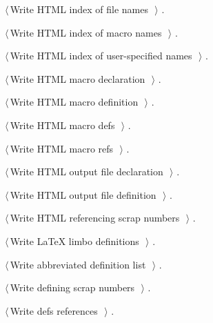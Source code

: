 \documentclass{report}
\begin{document}
{\begin{list}{}{\setlength{\itemsep}{-\parsep}\setlength{\itemindent}{-\leftmargin}}
\item $\langle\,$Write HTML index of file names\nobreak\ {\footnotesize {}}$\,\rangle$ {\footnotesize {\NWtxtRefIn} .}
\item $\langle\,$Write HTML index of macro names\nobreak\ {\footnotesize {}}$\,\rangle$ {\footnotesize {\NWtxtRefIn} .}
\item $\langle\,$Write HTML index of user-specified names\nobreak\ {\footnotesize {}}$\,\rangle$ {\footnotesize {\NWtxtRefIn} .}
\item $\langle\,$Write HTML macro declaration\nobreak\ {\footnotesize {}}$\,\rangle$ {\footnotesize {\NWtxtRefIn} .}
\item $\langle\,$Write HTML macro definition\nobreak\ {\footnotesize {}}$\,\rangle$ {\footnotesize {\NWtxtRefIn} .}
\item $\langle\,$Write HTML macro defs\nobreak\ {\footnotesize {}}$\,\rangle$ {\footnotesize {\NWtxtRefIn} .}
\item $\langle\,$Write HTML macro refs\nobreak\ {\footnotesize {}}$\,\rangle$ {\footnotesize {\NWtxtRefIn} .}
\item $\langle\,$Write HTML output file declaration\nobreak\ {\footnotesize {}}$\,\rangle$ {\footnotesize {\NWtxtRefIn} .}
\item $\langle\,$Write HTML output file definition\nobreak\ {\footnotesize {}}$\,\rangle$ {\footnotesize {\NWtxtRefIn} .}
\item $\langle\,$Write HTML referencing scrap numbers\nobreak\ {\footnotesize {}}$\,\rangle$ {\footnotesize {\NWtxtRefIn} .}
\item $\langle\,$Write LaTeX limbo definitions\nobreak\ {\footnotesize {}}$\,\rangle$ {\footnotesize {\NWtxtRefIn} .
}
\item $\langle\,$Write abbreviated definition list\nobreak\ {\footnotesize {}}$\,\rangle$ {\footnotesize {\NWtxtRefIn} .}
\item $\langle\,$Write defining scrap numbers\nobreak\ {\footnotesize {}}$\,\rangle$ {\footnotesize {\NWtxtRefIn} .}
\item $\langle\,$Write defs references\nobreak\ {\footnotesize {}}$\,\rangle$ {\footnotesize {\NWtxtRefIn} .}

\end{list}}
\end{document}
